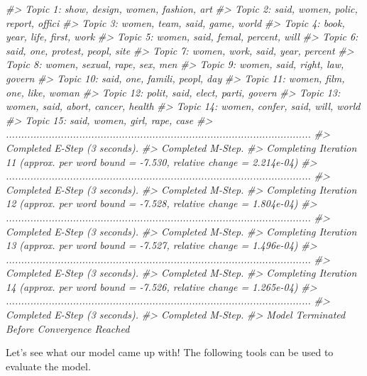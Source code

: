 \documentclass[]{book}
\newenvironment{Shaded}{\begin{snugshade}}{\end{snugshade}}
\newcommand{\CommentTok}[1]{\textcolor[rgb]{0.56,0.35,0.01}{\textit{#1}}}
\begin{document}
\begin{Shaded}
\begin{Highlighting}[]
\CommentTok{#> Topic 1: show, design, women, fashion, art }
\CommentTok{#>  Topic 2: said, women, polic, report, offici }
\CommentTok{#>  Topic 3: women, team, said, game, world }
\CommentTok{#>  Topic 4: book, year, life, first, work }
\CommentTok{#>  Topic 5: women, said, femal, percent, will }
\CommentTok{#>  Topic 6: said, one, protest, peopl, site }
\CommentTok{#>  Topic 7: women, work, said, year, percent }
\CommentTok{#>  Topic 8: women, sexual, rape, sex, men }
\CommentTok{#>  Topic 9: women, said, right, law, govern }
\CommentTok{#>  Topic 10: said, one, famili, peopl, day }
\CommentTok{#>  Topic 11: women, film, one, like, woman }
\CommentTok{#>  Topic 12: polit, said, elect, parti, govern }
\CommentTok{#>  Topic 13: women, said, abort, cancer, health }
\CommentTok{#>  Topic 14: women, confer, said, will, world }
\CommentTok{#>  Topic 15: said, women, girl, rape, case }
\CommentTok{#> ....................................................................................................}
\CommentTok{#> Completed E-Step (3 seconds). }
\CommentTok{#> Completed M-Step. }
\CommentTok{#> Completing Iteration 11 (approx. per word bound = -7.530, relative change = 2.214e-04) }
\CommentTok{#> ....................................................................................................}
\CommentTok{#> Completed E-Step (3 seconds). }
\CommentTok{#> Completed M-Step. }
\CommentTok{#> Completing Iteration 12 (approx. per word bound = -7.528, relative change = 1.804e-04) }
\CommentTok{#> ....................................................................................................}
\CommentTok{#> Completed E-Step (3 seconds). }
\CommentTok{#> Completed M-Step. }
\CommentTok{#> Completing Iteration 13 (approx. per word bound = -7.527, relative change = 1.496e-04) }
\CommentTok{#> ....................................................................................................}
\CommentTok{#> Completed E-Step (3 seconds). }
\CommentTok{#> Completed M-Step. }
\CommentTok{#> Completing Iteration 14 (approx. per word bound = -7.526, relative change = 1.265e-04) }
\CommentTok{#> ....................................................................................................}
\CommentTok{#> Completed E-Step (3 seconds). }
\CommentTok{#> Completed M-Step. }
\CommentTok{#> Model Terminated Before Convergence Reached}
\end{Highlighting}
\end{Shaded}

Let's see what our model came up with! The following tools can be used to evaluate the model.
\end{document}
